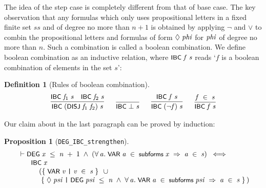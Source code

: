 \documentclass[letterpaper]{article}
\newtheorem{defn}{Definition}
\newtheorem{prop}{Proposition}
\renewcommand{\HOLConst}[1]{{\textsf{\upshape\small #1}}}
\renewcommand{\HOLinline}[1]{\ensuremath{#1}}
\newenvironment{holmath}{\begin{displaymath}\begin{array}{l}}{\end{array}\end{displaymath}\ignorespacesafterend}
\begin{document}
The idea of the step case is completely different from that of base case. The key observation that any formulas which only uses propositional letters in a fixed finite set $ss$ and of degree no more than $n+1$ is obtained by applying $\lnot$ and $\lor$ to combin the propositional letters and formulas of form \HOLinline{\HOLSymConst{\ensuremath{\Diamond}}\;\HOLFreeVar{phi}} for \HOLinline{\HOLFreeVar{phi}} of degree no more than $n$. Such a combination is called a boolean combination. We define boolean combination as an inductive relation, where \HOLinline{\HOLConst{IBC}\;\HOLFreeVar{f}\;\HOLFreeVar{s}} reads `$f$ is a boolean combination of elements in the set $s$':
\begin{defn}[Rules of boolean combination]
\[
\begin{array}{c}
  \infer{\HOLinline{\HOLConst{IBC}\;(\HOLConst{DISJ}\;\HOLFreeVar{f\sb{\mathrm{1}}}\;\HOLFreeVar{f\sb{\mathrm{2}}})\;\HOLFreeVar{s}}}{\HOLinline{\HOLConst{IBC}\;\HOLFreeVar{f\sb{\mathrm{1}}}\;\HOLFreeVar{s}}&\HOLinline{\HOLConst{IBC}\;\HOLFreeVar{f\sb{\mathrm{2}}}\;\HOLFreeVar{s}}} \ \ \ \ \ 
  \infer{\HOLinline{\HOLConst{IBC}\;\HOLSymConst{\ensuremath{\bot}}\;\HOLFreeVar{s}}}{} \ \ \ \ \ 
  \infer{\HOLinline{\HOLConst{IBC}\;(\HOLSymConst{\HOLTokenNeg{}}\HOLFreeVar{f})\;\HOLFreeVar{s}}}{\HOLinline{\HOLConst{IBC}\;\HOLFreeVar{f}\;\HOLFreeVar{s}}} \ \ \ \ \
  \infer{\HOLinline{\HOLConst{IBC}\;\HOLFreeVar{f}\;\HOLFreeVar{s}}}{\HOLinline{\HOLFreeVar{f}\;\HOLSymConst{\HOLTokenIn{}}\;\HOLFreeVar{s}}}
\end{array}
\]
\end{defn}

Our claim about in the last paragraph can be proved by induction:
\begin{prop}[\texttt{DEG_IBC_strengthen}]
\begin{holmath}
  \ensuremath{\HOLTokenTurnstile}\HOLConst{DEG}\;\HOLFreeVar{x}\;\HOLSymConst{\HOLTokenLeq{}}\;\HOLFreeVar{n}\;\HOLSymConst{\ensuremath{+}}\;\HOLNumLit{1}\;\HOLSymConst{\HOLTokenConj{}}\;(\HOLSymConst{\HOLTokenForall{}}\HOLBoundVar{a}.\;\HOLConst{VAR}\;\HOLBoundVar{a}\;\HOLSymConst{\HOLTokenIn{}}\;\HOLConst{subforms}\;\HOLFreeVar{x}\;\HOLSymConst{\HOLTokenImp{}}\;\HOLBoundVar{a}\;\HOLSymConst{\HOLTokenIn{}}\;\HOLFreeVar{s})\;\HOLSymConst{\HOLTokenEquiv{}}\\
\;\;\;\;\;\;\;\HOLConst{IBC}\;\HOLFreeVar{x}\\
\;\;\;\;\;\;\;\;\;\;\;(\HOLTokenLeftbrace{}\HOLConst{VAR}\;\HOLBoundVar{v}\;\HOLTokenBar{}\;\HOLBoundVar{v}\;\HOLSymConst{\HOLTokenIn{}}\;\HOLFreeVar{s}\HOLTokenRightbrace{}\;\HOLSymConst{\HOLTokenUnion{}}\\
\;\;\;\;\;\;\;\;\;\;\;\;\HOLTokenLeftbrace{}\HOLSymConst{\ensuremath{\Diamond}}\;\HOLBoundVar{psi}\;\HOLTokenBar{}\;\HOLConst{DEG}\;\HOLBoundVar{psi}\;\HOLSymConst{\HOLTokenLeq{}}\;\HOLFreeVar{n}\;\HOLSymConst{\HOLTokenConj{}}\;\HOLSymConst{\HOLTokenForall{}}\HOLBoundVar{a}.\;\HOLConst{VAR}\;\HOLBoundVar{a}\;\HOLSymConst{\HOLTokenIn{}}\;\HOLConst{subforms}\;\HOLBoundVar{psi}\;\HOLSymConst{\HOLTokenImp{}}\;\HOLBoundVar{a}\;\HOLSymConst{\HOLTokenIn{}}\;\HOLFreeVar{s}\HOLTokenRightbrace{})
\end{holmath}
\end{prop}
\end{document}
